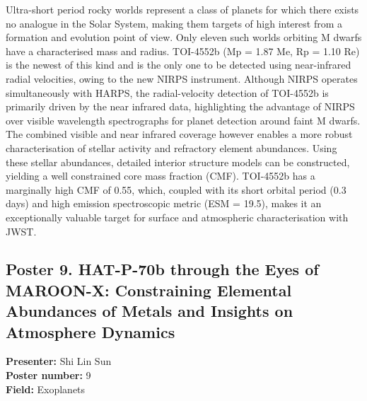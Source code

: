 Ultra-short period rocky worlds represent a class of planets for which there exists no analogue in the Solar System, making them targets of high interest from a formation and evolution point of view. Only eleven such worlds orbiting M dwarfs have a characterised mass and radius. TOI-4552b (Mp = 1.87 Me, Rp = 1.10 Re) is the newest of this kind and is the only one to be detected using near-infrared radial velocities, owing to the new NIRPS instrument. Although NIRPS operates simultaneously with HARPS, the radial-velocity detection of TOI-4552b is primarily driven by the near infrared data, highlighting the advantage of NIRPS over visible wavelength spectrographs for planet detection around faint M dwarfs. The combined visible and near infrared coverage however enables a more robust characterisation of stellar activity and refractory element abundances. Using these stellar abundances, detailed interior structure models can be constructed, yielding a well constrained core mass fraction (CMF). TOI-4552b has a marginally high CMF of 0.55, which, coupled with its short orbital period (0.3 days) and high emission spectroscopic metric (ESM = 19.5), makes it an exceptionally valuable target for surface and atmospheric characterisation with JWST.

\hypertarget{poster-abstract-talk-298}{}\label{poster-abstract-page-talk-298}
\subsection*{Poster 9. HAT-P-70b through the Eyes of MAROON-X: Constraining Elemental Abundances of Metals and Insights on Atmosphere Dynamics}
\textbf{Presenter:} Shi Lin Sun\\
\textbf{Poster number:} 9\\
\textbf{Field:} Exoplanets

